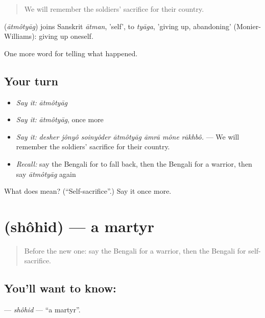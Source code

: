 \begin{quote}
We will remember the soldiers' sacrifice for their country.
\end{quote}

\begin{cousinweb}
\textbf{} (\emph{ātmôtyāg}) joins Sanskrit \emph{ātman}, 'self', to \emph{tyāga}, 'giving up, abandoning' (Monier-Williams): giving up oneself.
\end{cousinweb}

\begin{grammarlens}[title={What you've built}]
One more word for telling what happened.
\end{grammarlens}

\subsection*{Your turn}
\begin{itemize}
\raggedright
  \item \emph{Say it:} \emph{ātmôtyāg}
  \item \emph{Say it:} \emph{ātmôtyāg}, once more
  \item \emph{Say it:} \emph{desher jônyô soinyôder ātmôtyāg āmrā mône rākhbô.} — We will remember the soldiers' sacrifice for their country.
  \item \emph{Recall:} say the Bengali for to fall back, then the Bengali for a warrior, then say \emph{ātmôtyāg} again
\end{itemize}

\begin{tcolorbox}[breakable,colback=teal!4,colframe=teal!35!black,title={Before you move on}]
What does  mean? (\textquotedblleft{}Self-sacrifice\textquotedblright{}.) Say it once more.
\end{tcolorbox}
\section[\texorpdfstring{\bn{শহিদ} (shôhid)}{শহিদ (shôhid)}]{ (shôhid) — a martyr}

\label{lesson:BN-C317-shohid}



\begin{quote}
Before the new one: say the Bengali for a warrior, then the Bengali for self-sacrifice.
\end{quote}

\subsection*{You'll want to know: }
\textbf{} — \emph{shôhid} — \textquotedblleft{}a martyr\textquotedblright{}.

